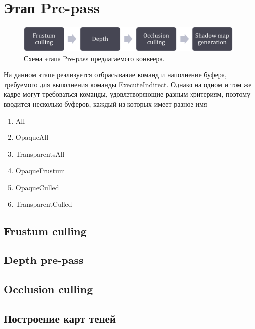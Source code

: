\section{Этап Pre-pass} \label{ch3:pre_pass}
	\begin{figure}[ht!] 
		\center
		\includegraphics [scale=0.4] {my_folder/images//prepass_schema}	
		\caption{Схема этапа Pre-pass предлагаемого конвеера.} 
		\label{fig:prepass_schema}
	\end{figure}
	
	На данном этапе реализуется отбрасывание команд и наполнение буфера, требуемого для выполнения команды ExecuteIndirect. Однако на одном и том же кадре могут требоваться команды, удовлетворяющие разным критериям, поэтому вводится несколько буферов, каждый из которых имеет разное имя
	\begin{enumerate}[1.]
		\item All
		\item OpaqueAll
		\item TransparentsAll
		\item OpaqueFrustum
		\item OpaqueCulled
		\item TransparentCulled
	\end{enumerate}

	\subsection{Frustum culling} \label{ch3:pre_pass:frustum}
	\subsection{Depth pre-pass} \label{ch3:pre_pass:depth}
	\subsection{Occlusion culling} \label{ch3:pre_pass:occlusion}
	\subsection{Построение карт теней} \label{ch3:pre_pass:shadow_maps}